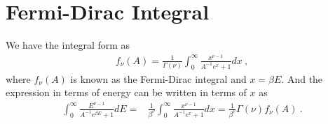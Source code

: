 \documentclass[amsmath,amssymb,aps,prb]{revtex4-2}
\begin{document}
    \section{Fermi-Dirac Integral}
    \label{App_B}
    We have the integral form as
    \begin{align}
    f_\nu (A)=\frac{1}{\Gamma (\nu)}\int_0^\infty \frac{x^{\nu-1}}{A^{-1} e^x+1} dx ~,
    \label{mom}
    \end{align}
    where $f_\nu (A)$ is known as the Fermi-Dirac integral and $x= \beta E$. And the expression in terms of energy can be written in terms of $x$ as
    \begin{align}
    \int_{0}^{\infty}  \frac{E^{\nu -1}}{A^{-1}e^{\beta E} + 1} dE = & \frac{1}{\beta^\nu} \int_0^\infty \frac{x^{\nu-1}}{A^{-1} e^x+1} dx = \frac{1}{\beta^\nu} \Gamma (\nu)  f_\nu (A)~.
    \end{align}
%
%
%
\end{document}
